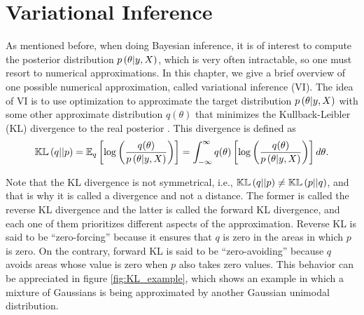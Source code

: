 
\chapter{Variational Inference}
\label{ch:variational_inference}



As mentioned before, when doing Bayesian inference, it is of interest to compute the posterior distribution $p\left( \theta | y, X \right)$, which is very often intractable, so one must resort to numerical approximations. In this chapter, we give a brief overview of one possible numerical approximation, called variational inference (VI). The idea of VI is to use optimization to approximate the target distribution $p\left( \theta | y, X \right)$ with some other approximate distribution $q(\theta)$ that minimizes the Kullback-Leibler (KL) divergence to the real posterior \cite{blei2017variational}. This divergence is defined as
\begin{equation}
  \label{eq:kl_divergence}
  \mathbb{KL}\left( q || p \right) = \mathbb{E}_q \left[ \log \left( \frac{q(\theta)}{p\left( \theta | y, X \right)} \right) \right] = \int_{-\infty}^{\infty} q(\theta) \left[ \log \left( \frac{q(\theta)}{p\left( \theta | y, X \right)} \right) \right] d\theta.
\end{equation}

Note that the KL divergence is not symmetrical, i.e., $\mathbb{KL}\left( q || p \right) \neq \mathbb{KL}\left( p || q \right)$, and that is why it is called a divergence and not a distance. The former is called the reverse KL divergence and the latter is called the forward KL divergence, and each one of them prioritizes different aspects of the approximation. Reverse KL is said to be ``zero-forcing'' because it ensures that $q$ is zero in the areas in which $p$ is zero. On the contrary, forward KL is said to be ``zero-avoiding'' because $q$ avoids areas whose value is zero when $p$ also takes zero values. This behavior can be appreciated in figure \ref{fig:KL_example}, which shows an example in which a mixture of Gaussians is being approximated by another Gaussian unimodal distribution.

